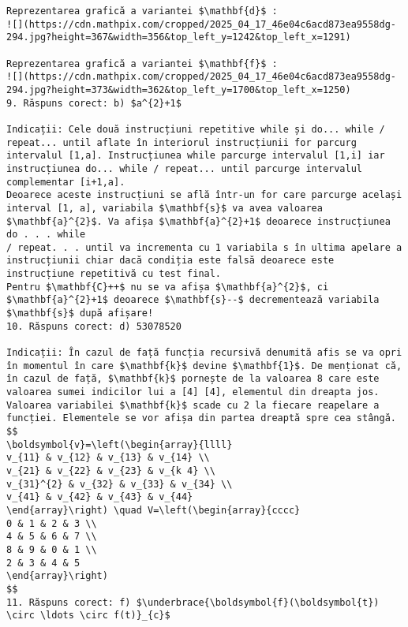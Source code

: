\begin{verbatim}
Reprezentarea grafică a variantei $\mathbf{d}$ :
![](https://cdn.mathpix.com/cropped/2025_04_17_46e04c6acd873ea9558dg-294.jpg?height=367&width=356&top_left_y=1242&top_left_x=1291)

Reprezentarea grafică a variantei $\mathbf{f}$ :
![](https://cdn.mathpix.com/cropped/2025_04_17_46e04c6acd873ea9558dg-294.jpg?height=373&width=362&top_left_y=1700&top_left_x=1250)
9. Răspuns corect: b) $a^{2}+1$

Indicații: Cele două instrucțiuni repetitive while și do... while / repeat... until aflate în interiorul instrucțiunii for parcurg intervalul [1,a]. Instrucțiunea while parcurge intervalul [1,i] iar instrucțiunea do... while / repeat... until parcurge intervalul complementar [i+1,a].
Deoarece aceste instrucțiuni se află într-un for care parcurge același interval [1, a], variabila $\mathbf{s}$ va avea valoarea $\mathbf{a}^{2}$. Va afișa $\mathbf{a}^{2}+1$ deoarece instrucțiunea do . . . while
/ repeat. . . until va incrementa cu 1 variabila s în ultima apelare a instrucțiunii chiar dacă condiția este falsă deoarece este instrucțiune repetitivă cu test final.
Pentru $\mathbf{C}++$ nu se va afișa $\mathbf{a}^{2}$, ci $\mathbf{a}^{2}+1$ deoarece $\mathbf{s}--$ decrementează variabila $\mathbf{s}$ după afișare!
10. Răspuns corect: d) 53078520

Indicații: În cazul de față funcția recursivă denumită afis se va opri în momentul în care $\mathbf{k}$ devine $\mathbf{1}$. De menționat că, în cazul de față, $\mathbf{k}$ pornește de la valoarea 8 care este valoarea sumei indicilor lui a [4] [4], elementul din dreapta jos.
Valoarea variabilei $\mathbf{k}$ scade cu 2 la fiecare reapelare a funcției. Elementele se vor afișa din partea dreaptă spre cea stângă.
$$
\boldsymbol{v}=\left(\begin{array}{llll}
v_{11} & v_{12} & v_{13} & v_{14} \\
v_{21} & v_{22} & v_{23} & v_{k 4} \\
v_{31}^{2} & v_{32} & v_{33} & v_{34} \\
v_{41} & v_{42} & v_{43} & v_{44}
\end{array}\right) \quad V=\left(\begin{array}{cccc}
0 & 1 & 2 & 3 \\
4 & 5 & 6 & 7 \\
8 & 9 & 0 & 1 \\
2 & 3 & 4 & 5
\end{array}\right)
$$
11. Răspuns corect: f) $\underbrace{\boldsymbol{f}(\boldsymbol{t}) \circ \ldots \circ f(t)}_{c}$


\end{verbatim}
